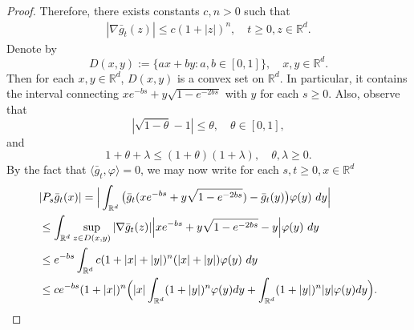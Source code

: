 \documentclass[12pt,a4paper]{amsart}
\theoremstyle{plain}
\theoremstyle{definition}
\numberwithin{equation}{section}
\begin{document}
\begin{proof}
Therefore, there exists constants $c,n>0$ such that 
\begin{align}\label{ineq: control of sup gt}
    |\nabla \bar g_t (z)| 
    \leq c(1+|z|)^n,
    \quad t\geq 0, z\in \mathbb R^d.
\end{align}
    Denote by
\[
    D(x,y):= \{ax+by: a,b\in [0,1]\},\quad x, y \in \mathbb R^d.
\]
    Then for each $x,y\in \mathbb R^d$, $D(x,y)$ is a convex set on $\mathbb R^d$. 
    In particular, it contains the interval connecting $xe^{-bs}+y\sqrt{1-e^{-2bs}}$ with $y$ for each $s\geq 0$.
    Also, observe that 
\[
    |\sqrt {1-\theta} - 1| \leq \theta, \quad \theta\in [0,1],
\]
and
\[
    1+\theta + \lambda \leq (1+\theta)(1+\lambda), \quad \theta ,\lambda \geq 0.
\]
    By the fact that $\langle \bar{g}_t,\varphi\rangle = 0$, we may now write for each $s,t\geq 0, x\in \mathbb R^d$
\begin{align}
    &|P_s\bar{g}_t(x)| 
    = \Big|\int_{\mathbb R^d} \big(\bar {g}_t(xe^{-bs}+y\sqrt{1-e^{-2bs}})-\bar {g}_t (y)\big) \varphi(y)~dy \Big| \\
    & \leq \int_{\mathbb R^d} \sup_{z\in D(x,y)} |\nabla \bar g_t (z)|\Big|xe^{-bs}+y\sqrt{1-e^{-2bs}}-y \Big| \varphi(y)~dy \\
    & \leq e^{-bs}\int_{\mathbb R^d} c(1+|x|+|y|)^n (|x|+|y|) \varphi(y)~dy
    \\& \leq ce^{-bs}(1+|x|)^n\Big(|x|\int_{\mathbb R^d} (1+|y|)^n\varphi(y)dy + \int_{\mathbb R^d}(1+|y|)^n|y|\varphi(y)dy\Big).
    \qedhere
\end{align}
\end{proof}
\end{document}
